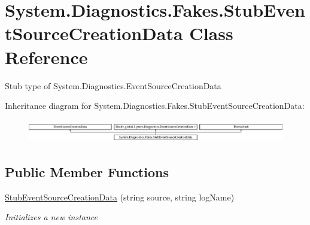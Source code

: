 \hypertarget{class_system_1_1_diagnostics_1_1_fakes_1_1_stub_event_source_creation_data}{\section{System.\-Diagnostics.\-Fakes.\-Stub\-Event\-Source\-Creation\-Data Class Reference}
\label{class_system_1_1_diagnostics_1_1_fakes_1_1_stub_event_source_creation_data}
}


Stub type of System.\-Diagnostics.\-Event\-Source\-Creation\-Data 


Inheritance diagram for System.\-Diagnostics.\-Fakes.\-Stub\-Event\-Source\-Creation\-Data\-:\begin{figure}[H]
\begin{center}
\leavevmode
\includegraphics[height=1.009009cm]{class_system_1_1_diagnostics_1_1_fakes_1_1_stub_event_source_creation_data}
\end{center}
\end{figure}
\subsection*{Public Member Functions}
\begin{DoxyCompactItemize}
\item 
\hyperlink{class_system_1_1_diagnostics_1_1_fakes_1_1_stub_event_source_creation_data_a27f9fe2ccd8368e644616e8bcf2003a2}{Stub\-Event\-Source\-Creation\-Data} (string source, string log\-Name)
\begin{DoxyCompactList}\small\item\em Initializes a new instance\end{DoxyCompactList}\end{DoxyCompactItemize}
